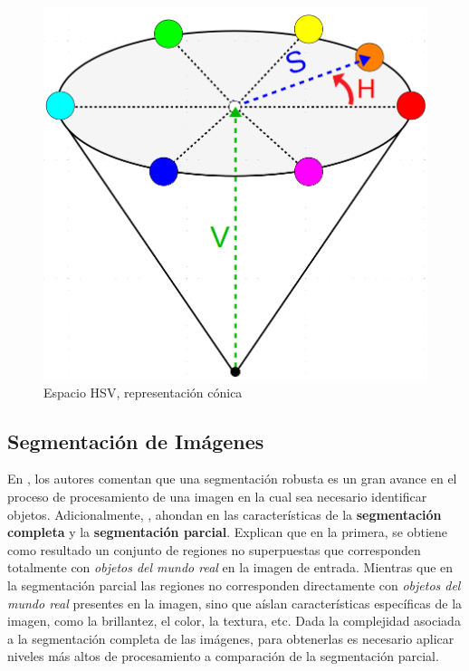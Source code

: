 \begin{figure}[H]
\centering
\includegraphics[scale=0.2]{Figures/ConoHSV.png}
    \caption{Espacio HSV, representación cónica}
    \label{fig:HSV_Space}
\end{figure}


\subsection{Segmentación de Imágenes}

En \cite{gonzalez_digital_2002}, los autores comentan que una segmentación robusta es un gran avance en el proceso de procesamiento de una imagen en la cual sea necesario identificar objetos. Adicionalmente, \cite{sonka_image_2008}, ahondan en las características de la \textbf{segmentación completa} y la \textbf{segmentación parcial}. Explican que en la primera, se obtiene como resultado un conjunto de regiones no superpuestas que corresponden totalmente con \textit{objetos del mundo real} en la imagen de entrada. Mientras que en la segmentación parcial las regiones no corresponden directamente con \textit{objetos del mundo real} presentes en la imagen, sino que aíslan características específicas de la imagen, como la brillantez, el color, la textura, etc. Dada la complejidad asociada a la segmentación completa de las imágenes, para obtenerlas es necesario aplicar niveles más altos de procesamiento a comparación de la segmentación parcial.



